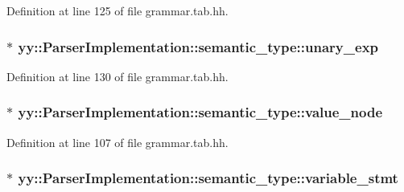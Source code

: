 Definition at line 125 of file grammar.tab.hh.

\hypertarget{unionyy_1_1_parser_implementation_1_1semantic__type_ab0260e6172464a57c1ca1cead3de47a8}{
\subsubsection[{unary\_\-exp}]{$\ast$ {\bf yy::ParserImplementation::semantic\_\-type::unary\_\-exp}}}
\label{unionyy_1_1_parser_implementation_1_1semantic__type_ab0260e6172464a57c1ca1cead3de47a8}


Definition at line 130 of file grammar.tab.hh.

\hypertarget{unionyy_1_1_parser_implementation_1_1semantic__type_a45f50a15129903892b1ef7de91406dfe}{
\subsubsection[{value\_\-node}]{$\ast$ {\bf yy::ParserImplementation::semantic\_\-type::value\_\-node}}}
\label{unionyy_1_1_parser_implementation_1_1semantic__type_a45f50a15129903892b1ef7de91406dfe}


Definition at line 107 of file grammar.tab.hh.

\hypertarget{unionyy_1_1_parser_implementation_1_1semantic__type_ac9bcc0c8c399d57c099e4657672464ca}{
\subsubsection[{variable\_\-stmt}]{$\ast$ {\bf yy::ParserImplementation::semantic\_\-type::variable\_\-stmt}}}
\label{unionyy_1_1_parser_implementation_1_1semantic__type_ac9bcc0c8c399d57c099e4657672464ca}


